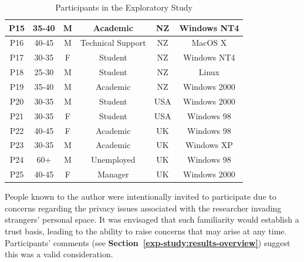 \begin{table}[hbt]
\begin{center}
\begin{footnotesize}
\begin{tabular}{|c|c|c|c|c|c|}
\hline
        P15 &      35-40 &          M &   Academic &         NZ & Windows NT4 \\
\hline
        P16 &      40-45 &          M & Technical Support &         NZ &    MacOS X \\
\hline
        P17 &      30-35 &          F &    Student &         NZ & Windows NT4 \\
\hline
        P18 &      25-30 &          M &    Student &         NZ &      Linux \\
\hline
        P19 &      35-40 &          M &   Academic &         NZ & Windows 2000 \\
\hline
        P20 &      30-35 &          M &    Student &        USA & Windows 2000 \\
\hline
        P21 &      30-35 &          F &    Student &        USA & Windows 98 \\
\hline
        P22 &      40-45 &          F &   Academic &         UK & Windows 98 \\
\hline
        P23 &      30-35 &          M &   Academic &         UK & Windows XP \\
\hline
        P24 &        60+ &          M & Unemployed &         UK & Windows 98 \\
\hline
        P25 &      40-45 &          F & Manager &         UK & Windows 2000 \\
\hline
\end{tabular}  
\end{footnotesize}
\caption{Participants in the Exploratory Study}
\label{table:exp-study:user_summary}
\end{center}
\end{table}
\normalsize

People known to the author were intentionally invited to participate due to concerns regarding the privacy issues associated with the researcher invading strangers' personal space. %
It was envisaged that such familiarity would establish a trust basis, leading to the ability to raise concerns that may arise at any time.  Participants' comments (see \textbf{Section~\ref{exp-study:results-overview}}) suggest this was a valid consideration. 

